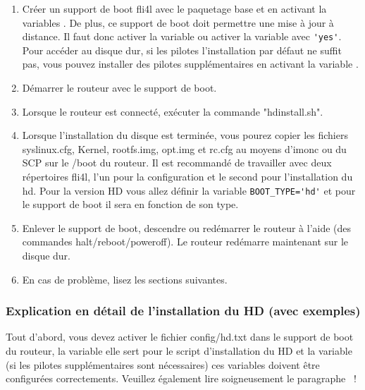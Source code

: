 \begin{enumerate}
    \item Créer un support de boot fli4l avec le paquetage base et en activant
    la variables . De plus, ce support de boot doit
    permettre une mise à jour à distance. Il faut donc activer la variable
     ou activer la variable  avec \verb*?'yes'?. 
    Pour accéder au disque dur, si les pilotes l'installation par défaut ne
    suffit pas, vous pouvez installer des pilotes supplémentaires en activant
    la variable .
    \item Démarrer le routeur avec le support de boot.
    \item Lorsque le routeur est connecté, exécuter la commande "hdinstall.sh".
    \item Lorsque l'installation du disque est terminée, vous pourez copier les
    fichiers syslinux.cfg, Kernel, rootfs.img, opt.img et rc.cfg au moyens
    d’imonc ou du SCP sur le /boot du routeur. Il est recommandé de travailler
    avec deux répertoires fli4l, l'un pour la configuration et le second pour
    l'installation du hd. Pour la version HD vous allez définir la variable
    \verb*?BOOT_TYPE='hd'? et pour le support de boot il sera en fonction de
    son type.

    \item Enlever le support de boot, descendre ou redémarrer le routeur à
    l'aide (des commandes halt/reboot/poweroff). Le routeur redémarre maintenant
    sur le disque dur.
    \item En cas de problème, lisez les sections suivantes.
\end{enumerate}

    \subsubsection{Explication en détail de l'installation du HD (avec exemples)}

    Tout d'abord, vous devez activer le fichier config/hd.txt dans le support
    de boot du routeur, la variable  elle sert pour le
    script d'installation du HD et la variable  (si les
    pilotes supplémentaires sont nécessaires) ces variables doivent
    être configurées correctements. Veuillez également lire soigneusement
    le paragraphe ~!

